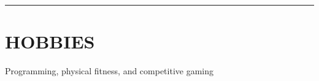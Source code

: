\documentclass[overlapped,centered]{res}
\begin{document}
\begin{resume}
\noindent\rule{12cm}{0.4pt}

\section{HOBBIES\\}  Programming, physical fitness, and competitive gaming

\end{resume}
\end{document}

